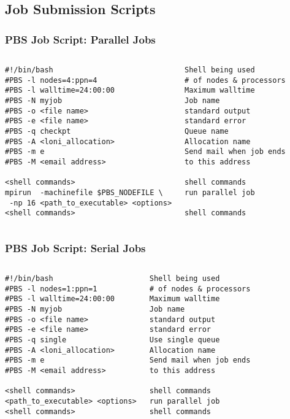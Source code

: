 \documentclass[slidestop,mathserif,compress,xcolor=svgnames,table]{beamer}
\newenvironment{ablock}[0]
{
\begin{beamerboxesrounded}[upper=uppercol,lower=lowercol,shadow=true]}
{\end{beamerboxesrounded}}
\newenvironment{eblock}[0]
{
\begin{beamerboxesrounded}[upper=uppercol2,lower=lowercol2,shadow=true]}
{\end{beamerboxesrounded}}
\begin{document}
\subsection{Job Submission Scripts}
\begin{frame}[fragile]
  \frametitle{\small PBS Job Script: Parallel Jobs}
  \begin{columns}
  \column{7.2cm}
  \begin{eblock}{}
    {\footnotesize
    \begin{verbatim}
#!/bin/bash
#PBS -l nodes=4:ppn=4
#PBS -l walltime=24:00:00
#PBS -N myjob
#PBS -o <file name>
#PBS -e <file name>
#PBS -q checkpt	
#PBS -A <loni_allocation>
#PBS -m e
#PBS -M <email address>

<shell commands>			
mpirun  -machinefile $PBS_NODEFILE \
 -np 16 <path_to_executable> <options>
<shell commands>
    \end{verbatim}
  }
  \end{eblock}
  \column{4.5cm}
  \begin{ablock}{}
    {\footnotesize %
    \begin{verbatim}
Shell being used
# of nodes & processors
Maximum walltime
Job name
standard output
standard error
Queue name
Allocation name
Send mail when job ends 
to this address

shell commands
run parallel job

shell commands
      \end{verbatim}
      }
    \end{ablock}
  \end{columns}
\end{frame}

\begin{frame}[fragile]
  \frametitle{\small PBS Job Script: Serial Jobs}
  \begin{columns}
    \column{7.2cm}
    \begin{eblock}{}
      {\footnotesize
      \begin{verbatim}
#!/bin/bash
#PBS -l nodes=1:ppn=1
#PBS -l walltime=24:00:00
#PBS -N myjob
#PBS -o <file name>
#PBS -e <file name>
#PBS -q single	
#PBS -A <loni_allocation>
#PBS -m e
#PBS -M <email address>

<shell commands>			
<path_to_executable> <options>
<shell commands>
      \end{verbatim}
    }
    \end{eblock}
    \column{4.5cm}
    \begin{ablock}{}
      {\footnotesize %
      \begin{verbatim}
Shell being used
# of nodes & processors
Maximum walltime
Job name
standard output
standard error
Use single queue 
Allocation name
Send mail when job ends 
to this address

shell commands
run parallel job
shell commands
      \end{verbatim}
      }
    \end{ablock}
  \end{columns}
\end{frame}
\end{document}
